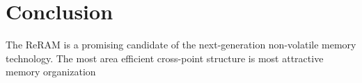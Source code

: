 \vspace{10pt}
\section{Conclusion}\label{sec:conclusion} 

The ReRAM is a promising candidate of the next-generation non-volatile memory technology. The most area efficient cross-point structure is most attractive memory organization  
